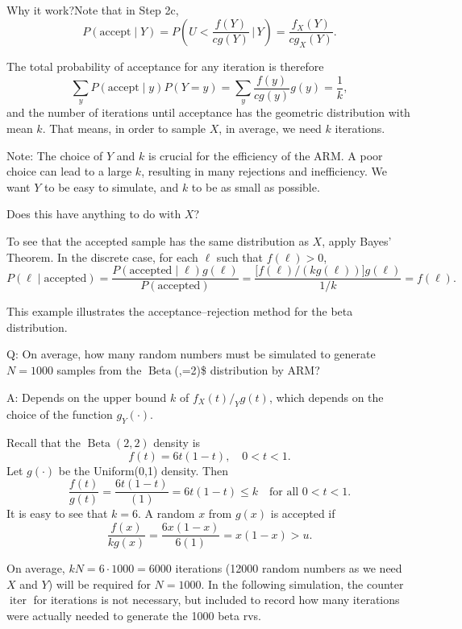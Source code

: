 \documentclass[
  letterpaper,
  DIV=11,
  numbers=noendperiod]{scrreprt}
\begin{document}
Why it work?Note that in Step 2c, \[
P(\text{accept} \mid Y) 
= P\!\left(U < \frac{f(Y)}{c g(Y)} \,\Big|\, Y\right) 
= \frac{f_X(Y)}{c g_X(Y)}.
\]

The total probability of acceptance for any iteration is therefore \[
\sum_y P(\text{accept} \mid y) P(Y = y) 
= \sum_y \frac{f(y)}{c g(y)} g(y) 
= \frac{1}{k},
\] and the number of iterations until acceptance has the geometric
distribution with mean \(k\). That means, in order to sample \(X\), in
average, we need \(k\) iterations.

Note: The choice of \(Y\) and \(k\) is crucial for the efficiency of the
ARM. A poor choice can lead to a large \(k\), resulting in many
rejections and inefficiency. We want \(Y\) to be easy to simulate, and
\(k\) to be as small as possible.

Does this have anything to do with \(X\)?

To see that the accepted sample has the same distribution as \(X\),
apply Bayes' Theorem. In the discrete case, for each \(\ell\) such that
\(f(\ell) > 0\), \[
P(\ell \mid \text{accepted}) 
= \frac{P(\text{accepted} \mid \ell) g(\ell)}{P(\text{accepted})} 
= \frac{\big[f(\ell)/(k g(\ell))\big] g(\ell)}{1/k} 
= f(\ell).
\]

This example illustrates the acceptance--rejection method for the beta
distribution.

Q: On average, how many random numbers must be simulated to generate
\(N=1000\) samples from the
\(\operatorname{Beta}\)(,=2)\$ distribution
by ARM?

A: Depends on the upper bound \(k\) of \(f_X(t)/_Yg(t)\), which depends
on the choice of the function \(g_Y(\cdot)\).

Recall that the \(\operatorname{Beta}(2,2)\) density is \[
f(t) = 6t(1-t), \quad 0 < t < 1.
\] Let \(g(\cdot)\) be the Uniform(0,1) density. Then \[
\frac{f(t)}{g(t)} = \frac{6t(1-t)}{(1)} = 6t(1-t) \leq k \quad \text{for all } 0 < t < 1.
\] It is easy to see that \(k = 6\). A random \(x\) from \(g(x)\) is
accepted if \[
\frac{f(x)}{kg(x)} = \frac{6x(1-x)}{6(1)} = x(1-x) > u.
\]

On average, \(kN = 6\cdot 1000 =6000\) iterations (12000 random numbers
as we need \(X\) and \(Y\)) will be required for \(N=1000\). In the
following simulation, the counter \(\operatorname{iter}\) for iterations
is not necessary, but included to record how many iterations were
actually needed to generate the 1000 beta rvs.
\end{document}
